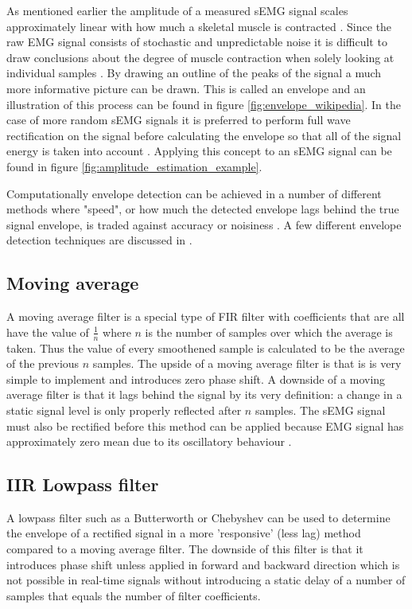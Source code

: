 As mentioned earlier the amplitude of a measured sEMG signal scales approximately linear with how much a skeletal muscle is contracted \cite{adaptive_filter_dry_electrode}. Since the raw EMG signal consists of stochastic and unpredictable noise it is difficult to draw conclusions about the degree of muscle contraction when solely looking at individual samples \cite{semg_signals_analysis_and_applications}. By drawing an outline of the peaks of the signal a much more informative picture can be drawn. This is called an envelope and an illustration of this process can be found in figure \ref{fig:envelope_wikipedia}. In the case of more random sEMG signals it is preferred to perform full wave rectification on the signal before calculating the envelope so that all of the signal energy is taken into account \cite{semg_signals_analysis_and_applications}. Applying this concept to an sEMG signal can be found in figure \ref{fig:amplitude_estimation_example}.

Computationally envelope detection can be achieved in a number of different methods where "speed", or how much the detected envelope lags behind the true signal envelope, is traded against accuracy or noisiness \cite{dsp_good_bad_ugly}. A few different envelope detection techniques are discussed in \cite{rose2011electromyogram}.

\subsection{Moving average}
A moving average filter is a special type of FIR filter with coefficients that are all have the value of $\frac{1}{n}$ where $n$ is the number of samples over which the average is taken. Thus the value of every smoothened sample is calculated to be the average of the previous $n$ samples. The upside of a moving average filter is that is is very simple to implement and introduces zero phase shift. A downside of a moving average filter is that it lags behind the signal by its very definition: a change in a static signal level is only properly reflected after $n$ samples. The sEMG signal must also be rectified before this method can be applied because EMG signal has approximately zero mean due to its oscillatory behaviour \cite{rose2011electromyogram}. 

\subsection{IIR Lowpass filter}
A lowpass filter such as a Butterworth or Chebyshev can be used to determine the envelope of a rectified signal in a more 'responsive' (less lag) method compared to a moving average filter. The downside of this filter is that it introduces phase shift unless applied in forward and backward direction \cite{rose2011electromyogram} which is not possible in real-time signals without introducing a static delay of a number of samples that equals the number of filter coefficients.

